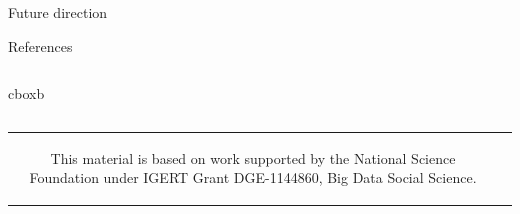 \documentclass[final]{beamer}
\newlength{\onecolwid}
\newlength{\onecolwidd}
\begin{document}
\begin{frame}[t]
\begin{columns}[t]
\begin{column}{\onecolwidd}
\begin{block}{Future direction}
\begin{rmfamily}
	\end{rmfamily}						
	\end{block}
	
	\vspace*{10mm}

	\begin{block}{References}
	\begin{rmfamily}
	
	
	\end{rmfamily}
	\end{block}

	\end{column}	
	\end{columns}
	
	

	\vspace{.9in} %
	\hspace*{.025in} \begin{beamercolorbox}[wd=50.75in,colsep=0.1cm]{cboxb}\end{beamercolorbox}
	\vspace{0.25in}
			
	\begin{columns}
		\vspace{0.3in}
		\begin{column}{0.3\paperwidth}	
				\centering
		\begin{tabular}{cc}

 \begin{minipage}{8.5in}
 \begin{rmfamily}
This material is based on work supported by the National Science Foundation under IGERT Grant DGE-1144860, Big Data Social Science.
\end{rmfamily}

\end{minipage}


\end{tabular}
\end{column}
\end{columns}
\end{frame}
\end{document}
